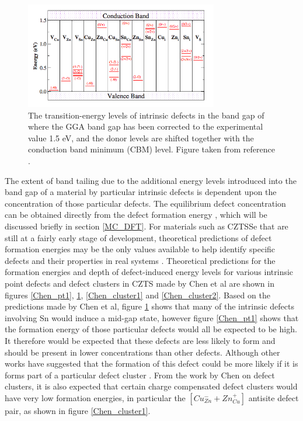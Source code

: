 \begin{figure}[h!]
  \centering
    \includegraphics[width=0.75\textwidth]{figures/Chen_pt_E-level.png}
    \caption{The transition-energy levels of intrinsic defects in the band gap of \CZTS where the GGA band gap has been corrected to the experimental value 1.5 eV, and the donor levels are shifted together with the conduction band minimum (CBM) level. Figure taken from reference .}
  \label{Chen_pt2}
\end{figure}

The extent of band tailing due to the additional energy levels introduced into the band gap of a material by particular intrinsic defects is dependent upon the concentration of those particular defects. The equilibrium defect concentration can be obtained directly from the defect formation energy \cite{DFT_in_mat}, which will be discussed briefly in section \ref{MC_DFT}. For materials such as CZTSSe that are still at a fairly early stage of development, theoretical predictions of defect formation energies may be the only values available to help identify specific defects and their properties in real systems \cite{kosyak}. Theoretical predictions for the formation energies and depth of defect-induced energy levels for various intrinsic point defects and defect clusters in CZTS made by Chen et al \cite{defect1} are shown in figures \ref{Chen_pt1}, \ref{Chen_pt2}, \ref{Chen_cluster1} and \ref{Chen_cluster2}. Based on the predictions made by Chen et al, figure \ref{Chen_pt2} shows that many of the intrinsic defects involving Sn would induce a mid-gap state, however figure \ref{Chen_pt1} shows that the formation energy of those particular defects would all be expected to be high. It therefore would be expected that these defects are less likely to form and should be present in lower concentrations than other defects. Although other works have suggested that the formation of this defect could be more likely if it is forms part of a particular defect cluster \cite{CZTS_n-type, culprit}. From the work by Chen on defect clusters, it is also expected that certain charge compensated defect clusters would have very low formation energies, in particular the $[Cu_{Zn}^{-} + Zn_{Cu}^{+}]$ antisite defect pair, as shown in figure \ref{Chen_cluster1}.


